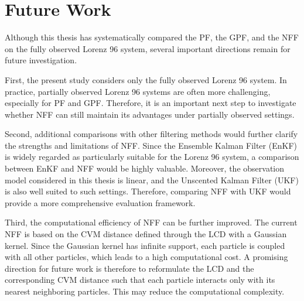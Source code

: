 \section{Future Work}

Although this thesis has systematically compared the PF, the GPF, and the NFF on the fully observed Lorenz 96 system, several important directions remain for future investigation.

First, the present study considers only the fully observed Lorenz 96 system. In practice, partially observed Lorenz 96 systems are often more challenging, especially for PF and GPF. Therefore, it is an important next step to investigate whether NFF can still maintain its advantages under partially observed settings.

Second, additional comparisons with other filtering methods would further clarify the strengths and limitations of NFF. Since the Ensemble Kalman Filter (EnKF) is widely regarded as particularly suitable for the Lorenz 96 system, a comparison between EnKF and NFF would be highly valuable. Moreover, the observation model considered in this thesis is linear, and the Unscented Kalman Filter (UKF) is also well suited to such settings. Therefore, comparing NFF with UKF would provide a more comprehensive evaluation framework.

Third, the computational efficiency of NFF can be further improved. The current NFF is based on the CVM distance defined through the LCD with a Gaussian kernel. Since the Gaussian kernel has infinite support, each particle is coupled with all other particles, which leads to a high computational cost. A promising direction for future work is therefore to reformulate the LCD and the corresponding CVM distance such that each particle interacts only with its nearest neighboring particles. This may reduce the computational complexity.